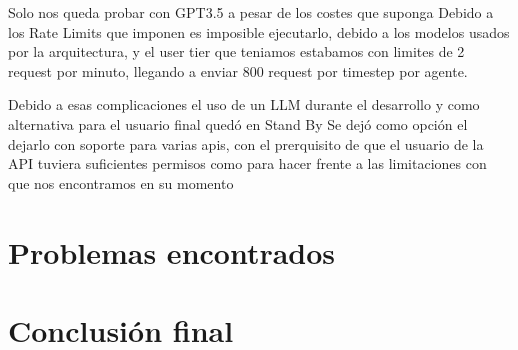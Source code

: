 	Solo nos queda probar con GPT3.5 a pesar de los costes que suponga
		Debido a los Rate Limits que imponen es imposible ejecutarlo, debido a los modelos usados por la arquitectura, y el user tier que teniamos estabamos con limites de 2 request por minuto, llegando a enviar 800 request por timestep por agente.
	
	Debido a esas complicaciones el uso de un LLM durante el desarrollo y como alternativa para el usuario final quedó en Stand By
		Se dejó como opción el dejarlo con soporte para varias apis, con el prerquisito de que el usuario de la API tuviera suficientes permisos como para hacer frente a las limitaciones con que nos encontramos en su momento

\section{Problemas encontrados}

\section{Conclusión final}
